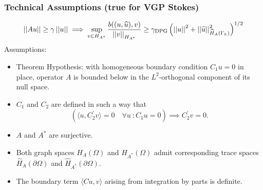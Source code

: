 \documentclass[mathserif]{beamer}
\newcommand{\NVRnorm}[1]{\left|\left|#1\right|\right|}
\begin{document}
\begin{frame}
\frametitle{Technical Assumptions (true for VGP Stokes)}
\[
\NVRnorm{Au} \geq \gamma \NVRnorm{u} \implies \sup_{v \in H_{A^{*}}} \frac{b((u,\widehat{u}),v)}{\NVRnorm{v}_{H_{A^{*}}}} \geq \gamma_{\rm DPG} \left(\NVRnorm{u}^{2} + \NVRnorm{\widehat{u}}^{2}_{\widehat{H}_{A}(\Gamma_{h})}\right)^{1/2}
\]
Assumptions:
\begin{itemize}
\item Theorem Hypothesis: with homogeneous boundary condition $C_{1}u=0$ in place, operator $A$ is bounded below in the $L^{2}$-orthogonal component of its null space.
\item $C_{1}$ and $C_{2}$ are defined in such a way that
\[ \left( \langle u,
  C_2^\prime v\rangle = 0 \quad \forall u \: : C_1 u = 0 \right) \implies
  C_2^\prime v = 0.
\]
\item $A$ and $A^{*}$ are surjective.
\item Both graph spaces $H_{A}(\Omega)$ and $H_{A^{*}}(\Omega)$ admit corresponding trace spaces $\widehat{H}_{A}(\partial \Omega)$ and $\widehat{H}_{A^{*}}(\partial \Omega)$.
\item The boundary term $\langle Cu, v \rangle$ arising from integration by parts is definite.
\end{itemize}

\end{frame}
 
\end{document}
